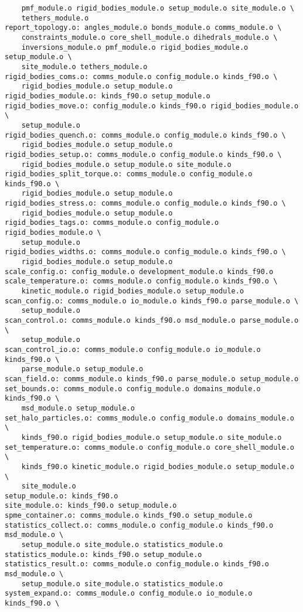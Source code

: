 \begin{verbatim}
	pmf_module.o rigid_bodies_module.o setup_module.o site_module.o \
	tethers_module.o
report_topology.o: angles_module.o bonds_module.o comms_module.o \
	constraints_module.o core_shell_module.o dihedrals_module.o \
	inversions_module.o pmf_module.o rigid_bodies_module.o setup_module.o \
	site_module.o tethers_module.o
rigid_bodies_coms.o: comms_module.o config_module.o kinds_f90.o \
	rigid_bodies_module.o setup_module.o
rigid_bodies_module.o: kinds_f90.o setup_module.o
rigid_bodies_move.o: config_module.o kinds_f90.o rigid_bodies_module.o \
	setup_module.o
rigid_bodies_quench.o: comms_module.o config_module.o kinds_f90.o \
	rigid_bodies_module.o setup_module.o
rigid_bodies_setup.o: comms_module.o config_module.o kinds_f90.o \
	rigid_bodies_module.o setup_module.o site_module.o
rigid_bodies_split_torque.o: comms_module.o config_module.o kinds_f90.o \
	rigid_bodies_module.o setup_module.o
rigid_bodies_stress.o: comms_module.o config_module.o kinds_f90.o \
	rigid_bodies_module.o setup_module.o
rigid_bodies_tags.o: comms_module.o config_module.o rigid_bodies_module.o \
	setup_module.o
rigid_bodies_widths.o: comms_module.o config_module.o kinds_f90.o \
	rigid_bodies_module.o setup_module.o
scale_config.o: config_module.o development_module.o kinds_f90.o
scale_temperature.o: comms_module.o config_module.o kinds_f90.o \
	kinetic_module.o rigid_bodies_module.o setup_module.o
scan_config.o: comms_module.o io_module.o kinds_f90.o parse_module.o \
	setup_module.o
scan_control.o: comms_module.o kinds_f90.o msd_module.o parse_module.o \
	setup_module.o
scan_control_io.o: comms_module.o config_module.o io_module.o kinds_f90.o \
	parse_module.o setup_module.o
scan_field.o: comms_module.o kinds_f90.o parse_module.o setup_module.o
set_bounds.o: comms_module.o config_module.o domains_module.o kinds_f90.o \
	msd_module.o setup_module.o
set_halo_particles.o: comms_module.o config_module.o domains_module.o \
	kinds_f90.o rigid_bodies_module.o setup_module.o site_module.o
set_temperature.o: comms_module.o config_module.o core_shell_module.o \
	kinds_f90.o kinetic_module.o rigid_bodies_module.o setup_module.o \
	site_module.o
setup_module.o: kinds_f90.o
site_module.o: kinds_f90.o setup_module.o
spme_container.o: comms_module.o kinds_f90.o setup_module.o
statistics_collect.o: comms_module.o config_module.o kinds_f90.o msd_module.o \
	setup_module.o site_module.o statistics_module.o
statistics_module.o: kinds_f90.o setup_module.o
statistics_result.o: comms_module.o config_module.o kinds_f90.o msd_module.o \
	setup_module.o site_module.o statistics_module.o
system_expand.o: comms_module.o config_module.o io_module.o kinds_f90.o \

\end{verbatim}
